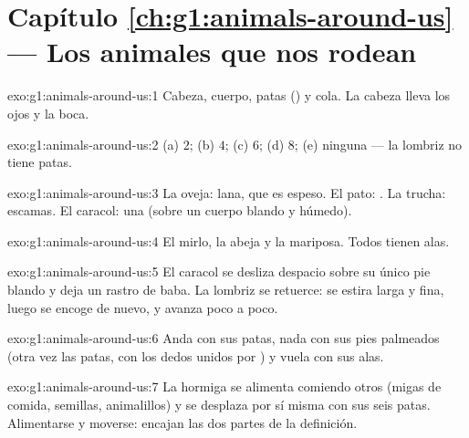 \section*{Capítulo \ref{ch:g1:animals-around-us} --- Los animales que nos rodean}

\begin{solution}{exo:g1:animals-around-us:1}
Cabeza, cuerpo, patas () y cola. La cabeza lleva los ojos
y la boca.
\end{solution}

\begin{solution}{exo:g1:animals-around-us:2}
(a) $2$; (b) $4$; (c) $6$; (d) $8$; (e) ninguna --- la lombriz no
tiene patas.
\end{solution}

\begin{solution}{exo:g1:animals-around-us:3}
La oveja: lana, que es  espeso. El pato: . La trucha:
escamas. El caracol: una  (sobre un cuerpo blando y húmedo).
\end{solution}

\begin{solution}{exo:g1:animals-around-us:4}
El mirlo, la abeja y la mariposa. Todos tienen alas.
\end{solution}

\begin{solution}{exo:g1:animals-around-us:5}
El caracol se desliza despacio sobre su único pie blando y deja un
rastro de baba. La lombriz se retuerce: se estira larga y fina, luego
se encoge de nuevo, y avanza poco a poco.
\end{solution}

\begin{solution}{exo:g1:animals-around-us:6}
Anda con sus patas, nada con sus pies palmeados (otra vez las patas,
con los dedos unidos por ) y vuela con sus alas.
\end{solution}

\begin{solution}{exo:g1:animals-around-us:7}
La hormiga se alimenta comiendo otros  (migas de comida,
semillas, animalillos) y se desplaza por sí misma con sus seis patas.
Alimentarse y moverse: encajan las dos partes de la definición.
\end{solution}


